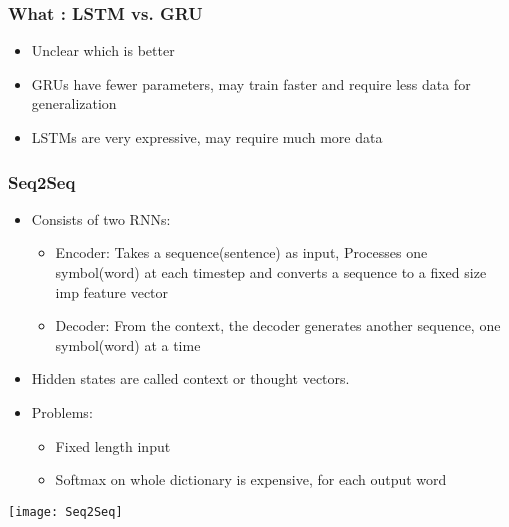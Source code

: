 
\begin{frame}[fragile] \frametitle{What : LSTM vs. GRU}
\begin{itemize}
\item  Unclear  which  is better
\item  GRUs  have fewer  parameters, may train faster and require less data for generalization
\item LSTMs  are  very expressive, may require much more data
\end{itemize}
\end{frame}


\begin{frame}[fragile] \frametitle{Seq2Seq}
\begin{itemize}
\item Consists of two RNNs:
\begin{itemize}
\item Encoder: Takes a sequence(sentence) as input, Processes one symbol(word) at each timestep and converts a sequence to a fixed size imp feature vector 
\item Decoder: From the context, the decoder generates another sequence, one symbol(word) at a time
\end{itemize}
\item Hidden states are called context or thought vectors.
\item Problems:
\begin{itemize}
\item Fixed length input
\item Softmax on whole dictionary is expensive, for each output word
\end{itemize}
\end{itemize}
\begin{center}
\texttt{[image: Seq2Seq]}
\end{center}
\end{frame}



%
%

